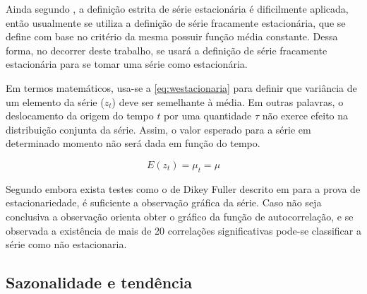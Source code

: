 \documentclass[
    12pt,
    oneside,
    a4paper,
    english,
    brazil
]{abntex2}
\begin{document}
Ainda segundo , a definição  estrita de série estacionária é
dificilmente  aplicada,  então  usualmente  se utiliza  a  definição  de  série
fracamente estacionária,  que se define com  base no critério da  mesma possuir
função média  constante. Dessa forma,  no decorrer  deste trabalho, se  usará a
definição  de  série fracamente  estacionária  para  se  tomar uma  série  como
estacionária.

Em  termos matemáticos,  usa-se a  \autoref{eq:westacionaria} para  definir que
variância  de um  elemento da  série ($z_t$)  deve ser  semelhante à  média. Em
outras  palavras, o  deslocamento da  origem do  tempo $t$  por uma  quantidade
$\tau$ não  exerce efeito  na distribuição  conjunta da  série. Assim,  o valor
esperado para a série em determinado momento não será dada em função do tempo.

\begin{equation}
    \label{eq:westacionaria}
    E(z_t) = \mu_t = \mu
\end{equation}






Segundo   embora  exista testes  como o  de Dikey
Fuller  descrito  em    para a  prova  de  estacionariedade,
é  suficiente  a observação  gráfica  da  série.  Caso  não seja  conclusiva  a
observação  orienta obter  o gráfico da função de
autocorrelação,  e  se  observada  a  existência  de  mais  de  20  correlações
significativas pode-se classificar a série como não estacionaria.

\subsection{Sazonalidade e tendência}
\end{document}
